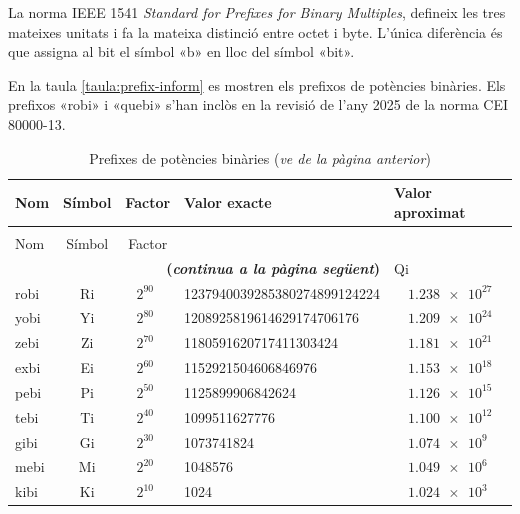 La norma IEEE 1541 \textit{Standard for Prefixes for Binary Multiples}, defineix les tres mateixes unitats i fa la mateixa distinció entre octet i byte. L'única diferència és que assigna al bit el símbol «b» en lloc del símbol «bit».

En la taula \vref{taula:prefix-inform} es mostren els prefixos de potències binàries. Els prefixos «robi» i «quebi» s'han inclòs en la revisió de l'any 2025 de la norma CEI 80000-13.
\begin{longtable}[h]{lccll}
   \caption{\label{taula:prefix-inform} Prefixos de potències binàries}\\
   \toprule[1pt]
    Nom & Símbol  & Factor & Valor exacte & Valor aproximat\\
   \midrule
   \endfirsthead
   \caption[]{Prefixes de potències binàries (\emph{ve de la pàgina anterior})}\\
   \toprule[1pt]
    Nom & Símbol  & Factor \\
   \midrule
   \endhead
   \midrule
   \multicolumn{4}{r}{\sffamily\bfseries\color{NavyBlue}(\emph{continua a la pàgina següent})}
   \endfoot
   \endlastfoot
   quebi & Qi   & $2^{100}$ & \num{1267650600228229401496703205376} &  $\quad\num{1,268e30}$ \\
   robi & Ri   & $2^{90\phantom{0}}$ & \num{1237940039285380274899124224} &  $\quad\num{1,238e27}$ \\
   yobi & Yi   & $2^{80\phantom{0}}$ & \num{1208925819614629174706176} &  $\quad\num{1,209e24}$ \\
   zebi & Zi   & $2^{70\phantom{0}}$ & \num{1180591620717411303424}&  $\quad\num{1,181e21}$ \\
   exbi & Ei   & $2^{60\phantom{0}}$ & \num{1152921504606846976}&  $\quad\num{1,153e18}$ \\
   pebi & Pi   & $2^{50\phantom{0}}$ & \num{1125899906842624}&  $\quad\num{1,126e15}$ \\
   tebi & Ti   & $2^{40\phantom{0}}$ & \num{1099511627776}&  $\quad\num{1,100e12}$ \\
   gibi & Gi   & $2^{30\phantom{0}}$ & \num{1073741824}&  $\quad\num{1,074e9}$  \\
   mebi & Mi   & $2^{20\phantom{0}}$ & \num{1048576} &  $\quad\num{1,049e6}$ \\
   kibi & Ki   & $2^{10\phantom{0}}$ & \num{1024} & $\quad\num{1,024e3}$  \\
   \bottomrule[1pt]
\end{longtable}
                     

